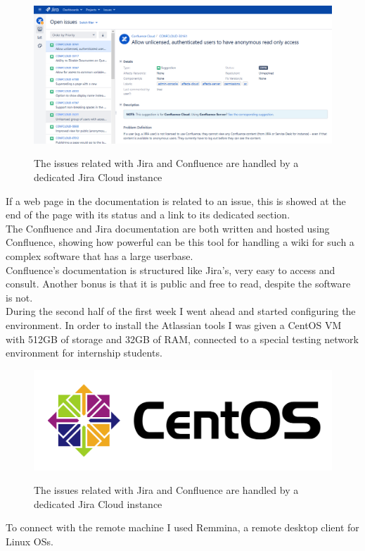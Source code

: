 	\begin{figure}[H]
		\centering
		\includegraphics[width=1\textwidth]{resources/confluence_documentation_issues_1}\\
		\caption{The issues related with Jira and Confluence are handled by a dedicated Jira Cloud instance}
	\end{figure}
	If a web page in the documentation is related to an issue, this is showed at the end of the page with its status and a link to its dedicated section.\\
	The Confluence and Jira documentation are both written and hosted using Confluence, showing how powerful can be this tool for handling a wiki for such a complex software that has a large userbase.\\
	Confluence's documentation is structured like Jira's, very easy to access and consult.	
	Another bonus is that it is public and free to read, despite the software is not.\\
	During the second half of the first week I went ahead and started configuring the environment.
	In order to install the Atlassian tools I was given a CentOS VM with 512GB of storage and 32GB of RAM, connected to a special testing network environment for internship students.
	\begin{figure}[H]
		\centering
		\includegraphics[width=.6\textwidth]{resources/centos_logo}\\
		\caption{The issues related with Jira and Confluence are handled by a dedicated Jira Cloud instance}
	\end{figure}
	To connect with the remote machine I used Remmina, a remote desktop client for Linux OSs.
	
